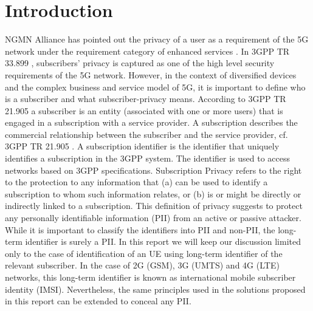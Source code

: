 \documentclass[lnicst,sechang,a4paper]{svmultln}
\begin{document}
\section{Introduction}
\label{intro} NGMN Alliance has pointed out the privacy of a user as a requirement of the 5G network under the requirement category of enhanced services \cite{NGMN_white_paper}. In 3GPP TR 33.899 \cite{TR33899}, subscribers' privacy is captured as one of the high level security requirements of the 5G network. However, in the context of diversified devices and the complex business and service model of 5G, it is important to define who is a subscriber and what subscriber-privacy means. According to 3GPP TR 21.905 \cite{TR21905} a subscriber is an entity (associated with one or more users) that is engaged in a subscription with a service provider. A subscription describes the commercial relationship between the subscriber and the service provider, cf. 3GPP TR 21.905 \cite{TR21905}. A subscription identifier is the identifier that uniquely identifies a subscription in the 3GPP system. The identifier is used to access networks based on 3GPP specifications. Subscription Privacy refers to the right to the protection to any information that (a) can be used to identify a subscription to whom such information relates, or (b) is or might be directly or indirectly linked to a subscription. This definition of privacy suggests to protect any personally identifiable information (PII) from an active or passive attacker. While it is important to classify the identifiers into PII and non-PII, the long-term identifier is surely a PII. In this report we will keep our discussion limited only to the case of identification of an UE using long-term identifier of the relevant subscriber. In the case of 2G (GSM), 3G (UMTS) and 4G (LTE) networks, this long-term identifier is known as international mobile subscriber identity (IMSI). Nevertheless, the same principles used in the solutions proposed in this report can be extended to conceal any PII.
\end{document}
